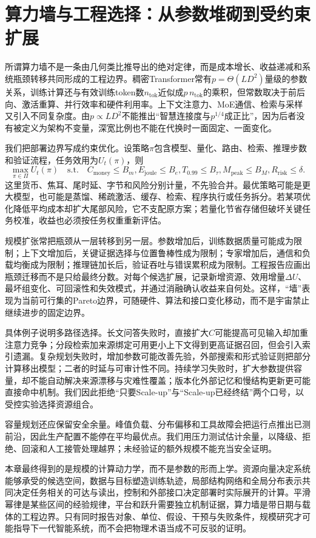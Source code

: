 \section{算力墙与工程选择：从参数堆砌到受约束扩展}
\label{sec:debunking_the_compute_wall}

所谓算力墙不是一条由几何类比推导出的绝对定律，而是成本增长、收益递减和系统瓶颈转移共同形成的工程边界。稠密Transformer常有$p=\Theta(LD^2)$量级的参数关系，训练计算还与有效训练token数$n_{\mathrm{tok}}$近似成$p\,n_{\mathrm{tok}}$的乘积，但常数取决于前后向、激活重算、并行效率和硬件利用率。上下文注意力、MoE通信、检索与采样又引入不同复杂度。由$p\propto LD^2$不能推出“智慧连接度与$p^{1/4}$成正比”，因为后者没有被定义为架构不变量，深宽比例也不能在代换时一面固定、一面变化。

我们把部署边界写成约束优化。设策略$\pi$包含模型、量化、路由、检索、推理步数和验证流程，任务效用为$U_t(\pi)$，则
\begin{equation}
\max_{\pi\in\Pi}U_t(\pi)
\quad\text{s.t.}\quad
C_{\mathrm{money}}\le B_m,
E_{\mathrm{joule}}\le B_e,
T_{0.99}\le B_\tau,
M_{\mathrm{peak}}\le B_M,
R_{\mathrm{risk}}\le\delta.
\end{equation}
这里货币、焦耳、尾时延、字节和风险分别计量，不先验合并。最优策略可能是更大模型，也可能是蒸馏、稀疏激活、缓存、检索、程序执行或任务拆分。若某项优化降低平均成本却扩大尾部风险，它不支配原方案；若量化节省存储但破坏关键任务校准，收益也必须按任务权重重新评估。

规模扩张常把瓶颈从一层转移到另一层。参数增加后，训练数据质量可能成为限制；上下文增加后，关键证据选择与位置鲁棒性成为限制；专家增加后，通信和负载均衡成为限制；推理链加长后，验证吞吐与错误累积成为限制。工程报告应画出瓶颈迁移而不是只给最终分数。对每个候选扩展，记录新增资源、效用增量$\Delta U$、最坏组变化、可回滚性和失效模式，并通过消融确认收益来自何处。这样，“墙”表现为当前可行集的Pareto边界，可随硬件、算法和接口变化移动，而不是宇宙禁止继续进步的固定边界。

具体例子说明多路径选择。长文问答失败时，直接扩大$C$可能提高可见输入却加重注意力竞争；分段检索加来源绑定可用更小上下文得到更高证据召回，但会引入索引遗漏。复杂规划失败时，增加参数可能改善先验，外部搜索和形式验证则把部分计算移出模型；二者的时延与可审计性不同。持续学习失败时，扩大参数提供容量，却不能自动解决来源漂移与灾难性覆盖；版本化外部记忆和慢结构更新更可能直接命中机制。我们因此拒绝“只要Scale-up”与“Scale-up已经终结”两个口号，以受控实验选择资源组合。

容量规划还应保留安全余量。峰值负载、分布偏移和工具故障会把运行点推出已测前沿，因此生产配置不能停在平均最优点。我们用压力测试估计余量，以降级、拒绝、回滚和人工接管处理越界；未经验证的额外规模不能充当安全证明。

本章最终得到的是规模的计算动力学，而不是参数的形而上学。资源向量决定系统能够承受的候选空间，数据与目标塑造训练轨迹，局部结构网络和全局分布表示共同决定任务相关的可达与读出，控制和外部接口决定部署时实际展开的计算。平滑幂律是某些区间的经验规律，平台和跃升需要独立机制证据，算力墙是带日期与载体的工程边界。只有同时报告对象、单位、假设、干预与失败条件，规模研究才可能指导下一代智能系统，而不会把物理术语当成不可反驳的证明。

